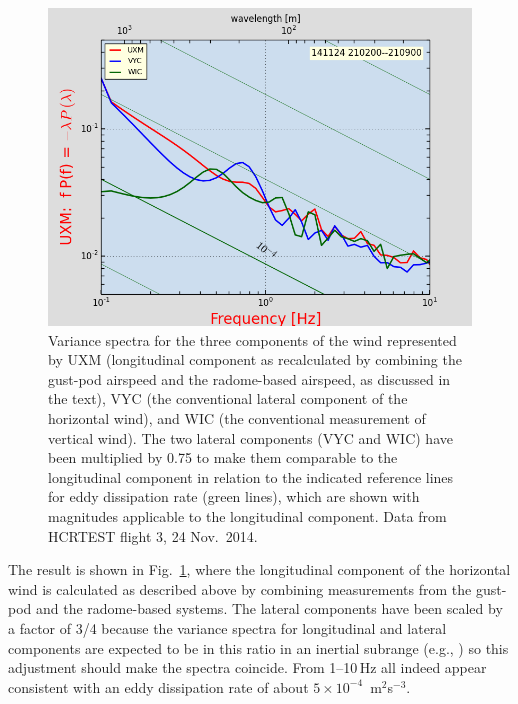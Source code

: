 \documentclass[12pt,twoside,english]{article}\usepackage[]{graphicx}\usepackage[]{color}
\let\OrgIndex\index
\renewcommand*{\index}[1]{\OrgIndex{#1}}
\begin{document}
\begin{figure}
\noindent \begin{centering}
\includegraphics[height=0.4\textheight]{SpecialGraphics/MEMPlot3Comp.png}  
\par\end{centering}

\protect\caption[Variance spectra for the three components of the wind.]{\label{fig:AppxB-3Comp}Variance spectra for the three components of the wind represented by UXM (longitudinal component as recalculated by combining the gust-pod airspeed and the radome-based airspeed, as discussed in the text), VYC (the conventional lateral component of the horizontal wind), and WIC (the conventional measurement of vertical wind). The two lateral components (VYC and WIC) have been multiplied by 0.75 to make them comparable to the longitudinal component in relation to the indicated reference lines for eddy dissipation rate (green lines), which are shown with magnitudes applicable to the longitudinal component. Data from HCRTEST flight 3, 24 Nov.\ 2014.} 
\end{figure}

The result is shown in Fig.~\ref{fig:AppxB-3Comp}, where the longitudinal component of the horizontal wind is calculated as described above by combining measurements from the gust-pod and the radome-based systems. The lateral components have been scaled by a factor of 3/4 because the variance spectra for longitudinal and lateral components are expected to be in this ratio in an inertial subrange (e.g., \citet{batchelor1953theory}) so this adjustment should make the spectra coincide. From 1--10\,Hz all indeed appear consistent with an eddy dissipation rate of about $5\times10^{-4}$~m$^{2}$s$^{-3}$. 
\end{document}
